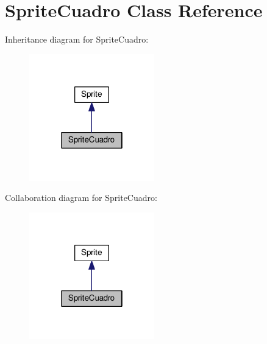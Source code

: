 \hypertarget{class_sprite_cuadro}{}\section{Sprite\+Cuadro Class Reference}
\label{class_sprite_cuadro}


Inheritance diagram for Sprite\+Cuadro\+:
\nopagebreak
\begin{figure}[H]
\begin{center}
\leavevmode
\includegraphics[width=154pt]{class_sprite_cuadro__inherit__graph}
\end{center}
\end{figure}


Collaboration diagram for Sprite\+Cuadro\+:
\nopagebreak
\begin{figure}[H]
\begin{center}
\leavevmode
\includegraphics[width=154pt]{class_sprite_cuadro__coll__graph}
\end{center}
\end{figure}
